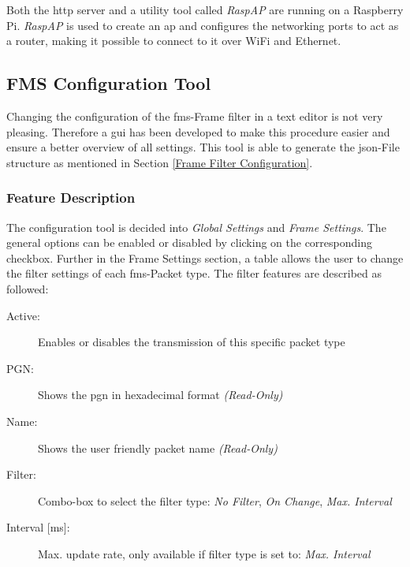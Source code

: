 Both the \acrshort{http} server and a utility tool called \textit{RaspAP} are running on a Raspberry Pi. \textit{RaspAP} is used to create an \acrlong{ap} and configures the networking ports to act as a router, making it possible to connect to it over WiFi and Ethernet.


\newpage

\newpage
\subsection{FMS Configuration Tool}
Changing the configuration of the \acrshort{fms}-Frame filter in a text editor is not very pleasing. Therefore a \acrfull{gui} has been developed to make this procedure easier and ensure a better overview of all settings. This tool is able to generate the \acrshort{json}-File structure as mentioned in Section \ref{Frame Filter Configuration}.

\subsubsection{Feature Description}
The configuration tool is decided into \textit{Global Settings} and \textit{Frame Settings}. The general options can be enabled or disabled by clicking on the corresponding checkbox. Further in the Frame Settings section, a table allows the user to change the filter settings of each \acrshort{fms}-Packet type. The filter features are described as followed:

\begin{description}
  \item[Active:] Enables or disables the transmission of this specific packet type
  \item[PGN:] Shows the \acrlong{pgn} in hexadecimal format \textit{(Read-Only)}
  \item[Name:] Shows the user friendly packet name \textit{(Read-Only)}
  \item[Filter:] Combo-box to select the filter type: \textit{No Filter}, \textit{On Change}, \textit{Max. Interval}
  \item[{Interval [ms]:}] Max. update rate, only available if filter type is set to: \textit{Max. Interval}
\end{description}

